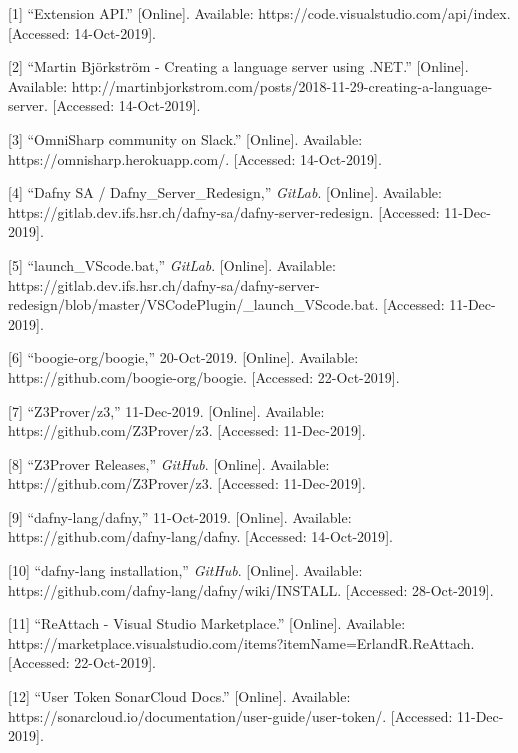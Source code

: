 \documentclass[]{book}
\begin{document}
{[}1{]} ``Extension API.'' {[}Online{]}. Available: https://code.visualstudio.com/api/index. {[}Accessed: 14-Oct-2019{]}.

{[}2{]} ``Martin Björkström - Creating a language server using .NET.'' {[}Online{]}. Available: http://martinbjorkstrom.com/posts/2018-11-29-creating-a-language-server. {[}Accessed: 14-Oct-2019{]}.

{[}3{]} ``OmniSharp community on Slack.'' {[}Online{]}. Available: https://omnisharp.herokuapp.com/. {[}Accessed: 14-Oct-2019{]}.

{[}4{]} ``Dafny SA / Dafny\_Server\_Redesign,'' \emph{GitLab}. {[}Online{]}. Available: https://gitlab.dev.ifs.hsr.ch/dafny-sa/dafny-server-redesign. {[}Accessed: 11-Dec-2019{]}.

{[}5{]} ``launch\_VScode.bat,'' \emph{GitLab}. {[}Online{]}. Available: https://gitlab.dev.ifs.hsr.ch/dafny-sa/dafny-server-redesign/blob/master/VSCodePlugin/\_launch\_VScode.bat. {[}Accessed: 11-Dec-2019{]}.

{[}6{]} ``boogie-org/boogie,'' 20-Oct-2019. {[}Online{]}. Available: https://github.com/boogie-org/boogie. {[}Accessed: 22-Oct-2019{]}.

{[}7{]} ``Z3Prover/z3,'' 11-Dec-2019. {[}Online{]}. Available: https://github.com/Z3Prover/z3. {[}Accessed: 11-Dec-2019{]}.

{[}8{]} ``Z3Prover Releases,'' \emph{GitHub}. {[}Online{]}. Available: https://github.com/Z3Prover/z3. {[}Accessed: 11-Dec-2019{]}.

{[}9{]} ``dafny-lang/dafny,'' 11-Oct-2019. {[}Online{]}. Available: https://github.com/dafny-lang/dafny. {[}Accessed: 14-Oct-2019{]}.

{[}10{]} ``dafny-lang installation,'' \emph{GitHub}. {[}Online{]}. Available: https://github.com/dafny-lang/dafny/wiki/INSTALL. {[}Accessed: 28-Oct-2019{]}.

{[}11{]} ``ReAttach - Visual Studio Marketplace.'' {[}Online{]}. Available: https://marketplace.visualstudio.com/items?itemName=ErlandR.ReAttach. {[}Accessed: 22-Oct-2019{]}.

{[}12{]} ``User Token \textbar{} SonarCloud Docs.'' {[}Online{]}. Available: https://sonarcloud.io/documentation/user-guide/user-token/. {[}Accessed: 11-Dec-2019{]}.
\end{document}
